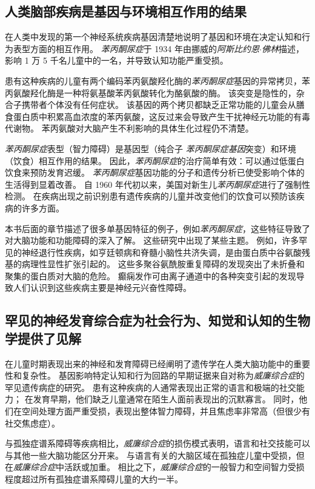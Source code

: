 \subsection{人类脑部疾病是基因与环境相互作用的结果}

在人类中发现的第一个神经系统疾病基因清楚地说明了基因和环境在决定认知和行为表型方面的相互作用。
\textit{苯丙酮尿症}于 1934 年由挪威的\textit{阿斯比约恩$\cdot$佛林}描述，影响 1 万 5 千名儿童中的一名，并导致认知功能严重受损。


患有这种疾病的儿童有两个编码苯丙氨酸羟化酶的\textit{苯丙酮尿症}基因的异常拷贝，苯丙氨酸羟化酶是一种将氨基酸苯丙氨酸转化为酪氨酸的酶。
该突变是隐性的，杂合子携带者个体没有任何症状。
该基因的两个拷贝都缺乏正常功能的儿童会从膳食蛋白质中积累高血浓度的苯丙氨酸，这反过来会导致产生干扰神经元功能的有毒代谢物。
苯丙氨酸对大脑产生不利影响的具体生化过程仍不清楚。


\textit{苯丙酮尿症}表型（智力障碍）是基因型（纯合子 \textit{苯丙酮尿症基因}突变）和环境（饮食）相互作用的结果。
因此，\textit{苯丙酮尿症}的治疗简单有效：可以通过低蛋白饮食来预防发育迟缓。
\textit{苯丙酮尿症}基因功能的分子和遗传分析已使受影响个体的生活得到显着改善。
自 1960 年代初以来，美国对新生儿\textit{苯丙酮尿症}进行了强制性检测。
在疾病出现之前识别患有遗传疾病的儿童并改变他们的饮食可以预防该疾病的许多方面。


本书后面的章节描述了很多单基因特征的例子，例如\textit{苯丙酮尿症}，这些特征导致了对大脑功能和功能障碍的深入了解。
这些研究中出现了某些主题。
例如，许多罕见的神经退行性疾病，如亨廷顿病和脊髓小脑性共济失调，是由蛋白质中谷氨酸残基的病理性显性扩张引起的。
这些多聚谷氨酰胺重复障碍的发现突出了未折叠和聚集的蛋白质对大脑的危险。
癫痫发作可由离子通道中的各种突变引起的发现导致人们认识到这些疾病主要是神经元兴奋性障碍。



\subsection{罕见的神经发育综合症为社会行为、知觉和认知的生物学提供了见解}

在儿童时期表现出来的神经和发育障碍已经阐明了遗传学在人类大脑功能中的重要性和复杂性。
基因影响特定认知和行为回路的早期证据来自对称为\textit{威廉综合症}的罕见遗传病症的研究。
患有这种疾病的人通常表现出正常的语言和极端的社交能力；
在发育早期，他们缺乏儿童通常在陌生人面前表现出的沉默寡言。
同时，他们在空间处理方面严重受损，表现出整体智力障碍，并且焦虑率非常高（但很少有社交焦虑症）。


与孤独症谱系障碍等疾病相比，\textit{威廉综合症}的损伤模式表明，语言和社交技能可以与其他一些大脑功能区分开来。
与语言有关的大脑区域在孤独症儿童中受损，但在\textit{威廉综合症}中活跃或加重。
相比之下，\textit{威廉综合症}的一般智力和空间智力受损程度超过所有孤独症谱系障碍儿童的大约一半。


